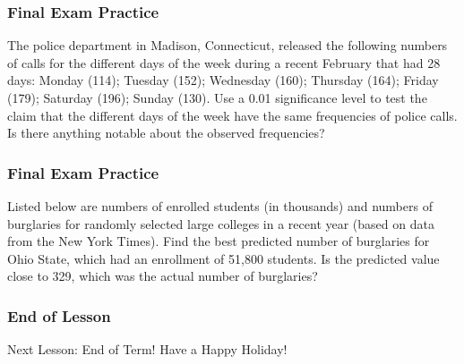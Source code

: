 \documentclass[xcolor=dvipsnames]{beamer}
\begin{document}
\begin{frame}
  \frametitle{Final Exam Practice}
  {\ubung} The police department in Madison, Connecticut, released the
  following numbers of calls for the different days of the week during
  a recent February that had 28 days: Monday (114); Tuesday (152);
  Wednesday (160); Thursday (164); Friday (179); Saturday (196);
  Sunday (130). Use a 0.01 significance level to test the claim that
  the different days of the week have the same frequencies of police
  calls. Is there anything notable about the observed frequencies?
\end{frame}

\begin{frame}
  \frametitle{Final Exam Practice}
  {\ubung} Listed below are numbers of enrolled students (in
  thousands) and numbers of burglaries for randomly selected large
  colleges in a recent year (based on data from the New York Times).
  Find the best predicted number of burglaries for Ohio State, which
  had an enrollment of 51,800 students. Is the predicted value close
  to 329, which was the actual number of burglaries?
\end{frame}

\begin{frame}
  \frametitle{End of Lesson}
Next Lesson: End of Term! Have a Happy Holiday!
\end{frame}
\end{document}
